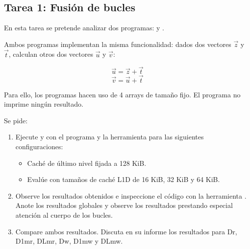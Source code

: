 \clearpage
\subsection{Tarea 1: Fusión de bucles}

En esta tarea se pretende analizar dos programas:  y .




Ambos programas implementan la misma funcionalidad:
dados dos vectores $\vec{z}$ y $\vec{t}$, calculan otros dos vectores $\vec{u}$ y $\vec{v}$:

\[
\vec{u} = \vec{z} + \vec{t}
\]
\[
\vec{v} = \vec{u} + \vec{t}
\]

Para ello, los programas hacen uso de 4 arrays de tamaño fijo.
El programa no imprime ningún resultado.

Se pide: 

\begin{enumerate}

\item Ejecute  y  con el programa
 y la herramienta  para las
siguientes configuraciones:

\begin{itemize}
\item Caché de último nivel fijada a 128 KiB.
\item Evalúe con tamaños de caché L1D de 16 KiB, 32 KiB y 64 KiB.
\end{itemize}

\item Observe los resultados obtenidos e inspeccione el código con la
herramienta . Anote los resultados globales y observe los
resultados prestando especial atención al cuerpo de los bucles.

\item Compare ambos resultados.
Discuta en su informe los resultados para Dr, D1mr, DLmr, Dw,
D1mw y DLmw.
 
\end{enumerate}

